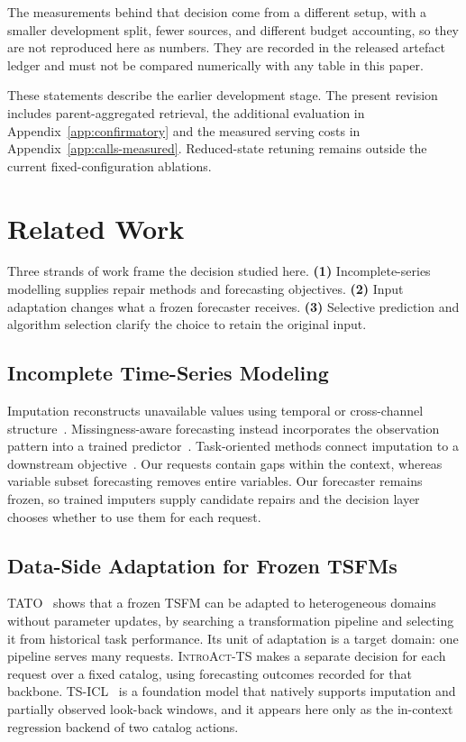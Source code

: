\documentclass{article}
\newcommand{\introact}{\textsc{IntroAct-TS}}
\newcommand{\tsfm}{TSFM}
\begin{document}
The measurements behind that decision come from a different setup, with a smaller
development split, fewer sources, and different budget accounting, so they are not reproduced
here as numbers. They are recorded in the released artefact ledger and must not be compared
numerically with any table in this paper.

These statements describe the earlier development stage. The present revision includes
parent-aggregated retrieval, the additional evaluation in Appendix~\ref{app:confirmatory}
and the measured serving costs in Appendix~\ref{app:calls-measured}. Reduced-state retuning
remains outside the current fixed-configuration ablations.

\section{Related Work}
\label{sec:related}
Three strands of work frame the decision studied here. \textbf{(1)} Incomplete-series modelling supplies repair methods and forecasting objectives. \textbf{(2)} Input adaptation changes what a frozen forecaster receives. \textbf{(3)} Selective prediction and algorithm selection clarify the choice to retain the original input.

\subsection{Incomplete Time-Series Modeling}
\label{sec:related-incomplete}
Imputation reconstructs unavailable values using temporal or cross-channel
structure~\citep{cao2018brits,tashiro2021csdi,yoon2018gain,wu2023timesnet,du2023saits,wang2025pswi,park2026t1}.
Missingness-aware forecasting instead incorporates the observation pattern into a trained
predictor~\citep{chen2024bitgraph,peng2025s4m,jang2026channeltokenformer}.
Task-oriented methods connect imputation to a downstream
objective~\citep{wang2024taskoriented,hao2025toivsf,hao2025gimcc,liang2025vida,xu2026srdi}.
Our requests contain gaps within the context, whereas variable subset forecasting removes
entire variables. Our forecaster remains frozen, so trained imputers supply candidate repairs
and the decision layer chooses whether to use them for each request.

\subsection{Data-Side Adaptation for Frozen \tsfm{}s}
\label{sec:related-dataside}
TATO~\citep{qiu2026tato} shows that a frozen \tsfm{} can be adapted to heterogeneous domains
without parameter updates, by searching a transformation pipeline and selecting it from
historical task performance. Its unit of adaptation is a target domain: one pipeline serves
many requests. \introact{} makes a separate decision for each request over a fixed catalog,
using forecasting outcomes recorded for that backbone. TS-ICL~\citep{tsicl2026} is a
foundation model that natively supports imputation and partially observed look-back windows,
and it appears here only as the in-context regression backend of two catalog actions.
\end{document}
